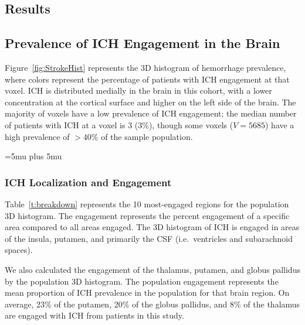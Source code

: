 \documentclass[12pt]{article}\usepackage[]{graphicx}\usepackage[]{color}
\begin{document}
\begin{refsection}
\section*{Results}

\subsection*{Prevalence of ICH Engagement in the Brain}

Figure~\ref{fig:StrokeHist} represents the 3D histogram of hemorrhage prevalence, where colors represent the percentage of patients with ICH engagement at that voxel.  ICH is distributed medially in the brain in this cohort, with a lower concentration at the cortical surface and higher on the left side of the brain.   The majority of voxels have a low prevalence of ICH engagement; the median number of patients with ICH at a voxel is 3 (3\%), though some voxels ($V{=}5685$) have a high prevalence of ${>}40\%$ of the sample population.  


\thickmuskip=5mu plus 5mu



\subsubsection*{ICH Localization and Engagement}
Table~\ref{t:breakdown} represents the 10 most-engaged regions for the population 3D histogram.  The engagement represents the percent engagement of a specific area compared to all areas engaged.  The 3D histogram of ICH is engaged in areas of the insula, putamen, and primarily the CSF (i.e.~ventricles and subarachnoid spaces). 

We also calculated the engagement of the thalamus, putamen, and globus pallidus by the population 3D histogram.  The population engagement represents the mean proportion of ICH prevalence in the population for that brain region.  On average, 23\% of the putamen, 20\% of the globus pallidus, and 8\% of the thalamus are engaged with ICH from patients in this study. 


\end{refsection}
\end{document}
